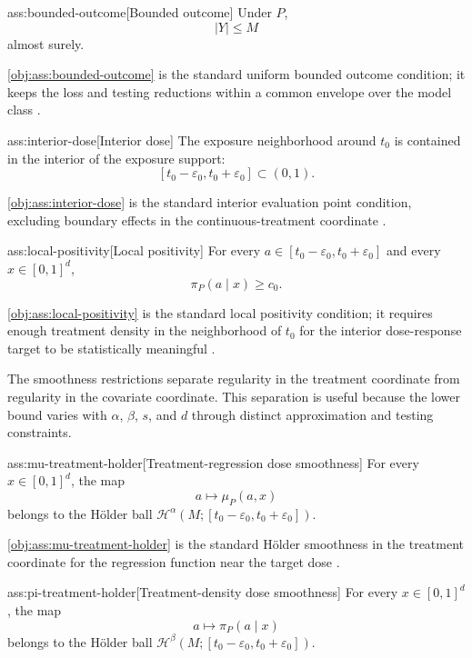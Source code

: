 \begin{assumptionv}{ass:bounded-outcome}[Bounded outcome]
Under \(P\),
\[
|Y|\le M
\]
almost surely.
\end{assumptionv}

\cref{obj:ass:bounded-outcome} is the standard uniform bounded outcome condition; it keeps the loss and testing reductions within a common envelope over the model class \citep{bonvini2022}.

\begin{assumptionv}{ass:interior-dose}[Interior dose]
The exposure neighborhood around \(t_0\) is contained in the interior of the exposure support:
\[
[t_0-\varepsilon_0,t_0+\varepsilon_0]\subset(0,1).
\]
\end{assumptionv}

\cref{obj:ass:interior-dose} is the standard interior evaluation point condition, excluding boundary effects in the continuous-treatment coordinate \citep{colangelo2020}.

\begin{assumptionv}{ass:local-positivity}[Local positivity]
For every \(a\in[t_0-\varepsilon_0,t_0+\varepsilon_0]\) and every \(x\in[0,1]^d\),
\[
\pi_P(a\mid x)\ge c_0.
\]
\end{assumptionv}

\cref{obj:ass:local-positivity} is the standard local positivity condition; it requires enough treatment density in the neighborhood of \(t_0\) for the interior dose-response target to be statistically meaningful \citep{bonvini2022}.

The smoothness restrictions separate regularity in the treatment coordinate from regularity in the covariate coordinate. This separation is useful because the lower bound varies with \(\alpha\), \(\beta\), \(s\), and \(d\) through distinct approximation and testing constraints.

\begin{assumptionv}{ass:mu-treatment-holder}[Treatment-regression dose smoothness]
For every \(x\in[0,1]^d\), the map
\[
a\longmapsto \mu_P(a,x)
\]
belongs to the Hölder ball \(\mathcal H^\alpha(M;[t_0-\varepsilon_0,t_0+\varepsilon_0])\).
\end{assumptionv}

\cref{obj:ass:mu-treatment-holder} is the standard Hölder smoothness in the treatment coordinate for the regression function near the target dose \citep{tsybakov2009}.

\begin{assumptionv}{ass:pi-treatment-holder}[Treatment-density dose smoothness]
For every \(x\in[0,1]^d\), the map
\[
a\longmapsto \pi_P(a\mid x)
\]
belongs to the Hölder ball \(\mathcal H^\beta(M;[t_0-\varepsilon_0,t_0+\varepsilon_0])\).
\end{assumptionv}

